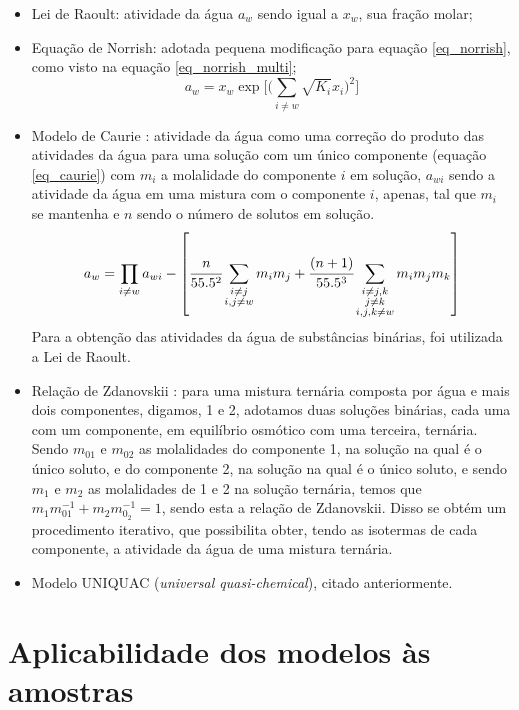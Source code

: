 \documentclass[
	12pt,				%
	openright,
	twoside,
	a4paper,			%
	english,			%
	french,				%
	brazil				%
	]{abntex2}
\begin{document}
\begin{itemize}
	\item Lei de Raoult: atividade da água $a_w$ sendo igual a $x_w$,
		sua fração molar;
	\item Equação de Norrish: adotada pequena modificação para equação
		\ref{eq_norrish}, como visto na equação \ref{eq_norrish_multi};
		\begin{equation}
			\label{eq_norrish_multi}
			a_w = x_w\exp\Big[\Big(\sum_{i \neq w}%
			\sqrt{K_i}x_i\Big)^2\Big]
		\end{equation}
	\item Modelo de Caurie \cite{caurie1986}: atividade da água como uma
		correção do produto das atividades da água para uma solução
		com um único componente (equação \ref{eq_caurie}) com
		$m_i$ a molalidade do componente $i$ em solução, $a_{wi}$
		sendo a atividade da água em uma mistura com o componente
		$i$, apenas, tal que $m_i$ se mantenha e $n$ sendo o número de
		solutos em solução.
		\begin{equation}
			\label{eq_caurie}
			a_w = \prod_{i \neq w}a_{wi}-\left[\cfrac{n}%
			{55.5^2}\sum_{\substack{i \neq j \\ i,j \neq w}}%
			m_im_j + \cfrac{(n+1)}{55.5^3}\sum_{%
			\substack{i\neq j,k \\ j \neq k \\  i,j,k \neq w}}%
			m_im_jm_k\right]
		\end{equation}
		Para a obtenção das atividades da água de substâncias
		binárias, foi utilizada a Lei de Raoult.
	\item Relação de Zdanovskii \cite{chen1973,sangster1973}:
		para uma mistura ternária composta por água e mais dois
		componentes, digamos, 1 e 2, adotamos duas soluções binárias,
		cada uma com um componente, em equilíbrio osmótico com uma
		terceira, ternária. Sendo $m_{01}$ e $m_{02}$ as
		molalidades do componente 1, na solução na qual é o único
		soluto, e do componente 2, na solução na qual é o único soluto, e
		sendo $m_1$ e $m_2$ as molalidades de 1 e 2 na solução ternária,
		temos que $m_1m_{01}^{-1} + m_2m_{0_2}^{-1} = 1$, sendo esta a
		relação de Zdanovskii. Disso se obtém um procedimento iterativo,
		que possibilita obter, tendo as isotermas de cada componente, a
		atividade da água de uma mistura ternária.
	\item Modelo UNIQUAC (\textit{universal quasi-chemical}), citado
		anteriormente.
\end{itemize}

\section{Aplicabilidade dos modelos às amostras}
\end{document}
